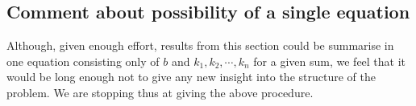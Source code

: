 \subsection{Comment about possibility of a single equation}
Although, given enough effort, results from this section could be summarise in one 
equation consisting only 
of $b$ and $k_1, k_2, \cdots, k_n$ for a given sum, 
we feel that it would be long enough not to give any new 
insight into the structure of the problem. We are stopping thus at giving the above procedure.


